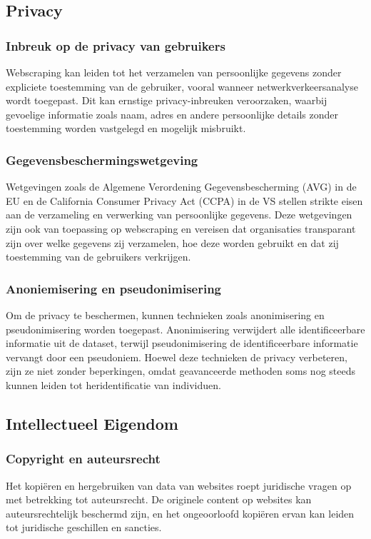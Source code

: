 \subsection{Privacy}
\subsubsection{Inbreuk op de privacy van gebruikers}
Webscraping kan leiden tot het verzamelen van persoonlijke gegevens zonder expliciete toestemming van de gebruiker, vooral wanneer netwerkverkeersanalyse wordt toegepast. Dit kan ernstige privacy-inbreuken veroorzaken, waarbij gevoelige informatie zoals naam, adres en andere persoonlijke details zonder toestemming worden vastgelegd en mogelijk misbruikt.

\subsubsection{Gegevensbeschermingswetgeving}
Wetgevingen zoals de Algemene Verordening Gegevensbescherming (AVG) in de EU en de California Consumer Privacy Act (CCPA) in de VS stellen strikte eisen aan de verzameling en verwerking van persoonlijke gegevens. Deze wetgevingen zijn ook van toepassing op webscraping en vereisen dat organisaties transparant zijn over welke gegevens zij verzamelen, hoe deze worden gebruikt en dat zij toestemming van de gebruikers verkrijgen.

\subsubsection{Anoniemisering en pseudonimisering}
Om de privacy te beschermen, kunnen technieken zoals anonimisering en pseudonimisering worden toegepast. Anonimisering verwijdert alle identificeerbare informatie uit de dataset, terwijl pseudonimisering de identificeerbare informatie vervangt door een pseudoniem. Hoewel deze technieken de privacy verbeteren, zijn ze niet zonder beperkingen, omdat geavanceerde methoden soms nog steeds kunnen leiden tot heridentificatie van individuen.

\subsection{Intellectueel Eigendom}
\subsubsection{Copyright en auteursrecht}
Het kopiëren en hergebruiken van data van websites roept juridische vragen op met betrekking tot auteursrecht. De originele content op websites kan auteursrechtelijk beschermd zijn, en het ongeoorloofd kopiëren ervan kan leiden tot juridische geschillen en sancties.

